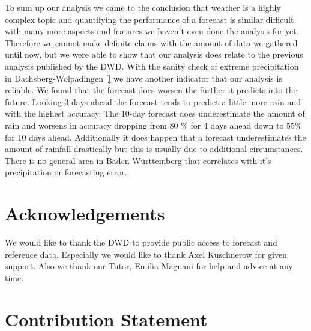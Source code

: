 \documentclass{article}
\theoremstyle{plain}
\theoremstyle{definition}
\theoremstyle{remark}
\begin{document}
To sum up our analysis we came to the conclusion that weather is a highly complex topic and quantifying the performance of a forecast is similar difficult with many more aspects and features we haven't even done the analysis for yet. Therefore we cannot make definite claims with the amount of data we gathered until now, but we were able to show that our analysis does relate to the previous analysis published by the DWD. %
With the sanity check of extreme precipitation in Dachsberg-Wolpadingen \ref{}  we have another indicator that our analysis is reliable.  %
We found that the forecast does worsen the further it predicts into the future. Looking 3 days ahead the forecast tends to predict a little more rain and with the highest accuracy. The 10-day forecast does underestimate the amount of rain and worsens in accuracy dropping from 80 \% for 4 days ahead down to 55\% for 10 days ahead. Additionally it does happen that a forecast underestimates the amount of rainfall drastically but this is usually due to additional circumstances. There is no general area in Baden-Württemberg that correlates with it's precipitation or forecasting error.


\section*{Acknowledgements}

We would like to thank the DWD to provide public access to forecast and reference data. Especially we would like to thank Axel Kuschnerow for given support. Also we thank our Tutor, Emilia Magnani for help and advice at any time.


\section*{Contribution Statement}
\end{document}
